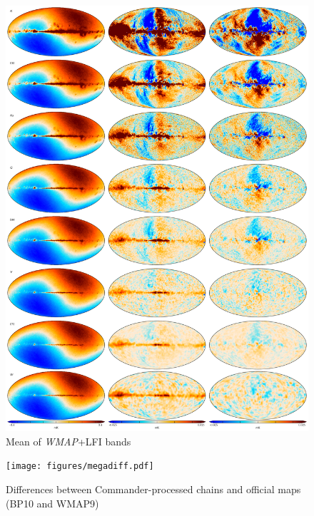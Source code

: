 \documentclass[twocolumn]{../../common/aa}
\begin{document}
\begin{figure}
	\centering
	\includegraphics[width=0.93\linewidth]{figures/megaplot.pdf}
	\caption{Mean of \textit{WMAP}+LFI bands}
\end{figure}

\begin{figure}
	\centering
	\texttt{[image: figures/megadiff.pdf]}
	\caption{Differences between Commander-processed chains and official maps (BP10 and WMAP9)}
\end{figure}
\end{document}
